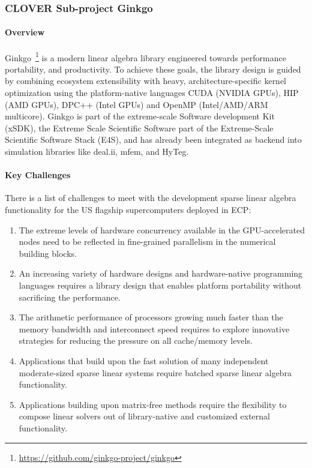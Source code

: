 \subsubsection{ CLOVER Sub-project Ginkgo} \label{subsubsect:peeks}
\paragraph{Overview} 
Ginkgo~\footnote{\url{https://github.com/ginkgo-project/ginkgo}} 
is a modern linear algebra library engineered towards performance portability, and productivity. 
To achieve these goals, the library design is guided by combining ecosystem extensibility with heavy, 
architecture-specific kernel optimization using the platform-native languages CUDA (NVIDIA GPUs), 
HIP (AMD GPUs), DPC++ (Intel GPUs) and OpenMP (Intel/AMD/ARM multicore). 
Ginkgo is part of the extreme-scale Software development Kit (xSDK), 
the Extreme Scale Scientific Software part of the Extreme-Scale Scientific Software Stack (E4S), 
and has already been integrated as backend into simulation libraries like deal.ii, mfem, and HyTeg. 



\paragraph{Key  Challenges}
There is a list of challenges to meet with the development sparse linear algebra functionality for the US flagship supercomputers 
deployed in ECP:
\begin{enumerate}
\item 
The extreme levels of hardware concurrency available in the 
GPU-accelerated nodes need to be reflected in fine-grained parallelism 
in the numerical building blocks.
\item
An increasing variety of hardware designs and hardware-native programming 
languages requires a library design that enables platform portability without sacrificing 
the performance.
\item
The arithmetic performance of processors growing much faster than the memory 
bandwidth and interconnect speed requires to explore innovative strategies for 
reducing the pressure on all cache/memory levels.
\item
Applications that build upon the fast solution of many independent moderate-sized 
sparse linear systems require batched sparse linear algebra functionality.
\item
Applications building upon matrix-free methods require the flexibility to 
compose linear solvers out of library-native and customized external functionality.
\end{enumerate}


